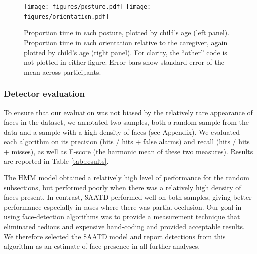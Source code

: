\documentclass[10pt,letterpaper]{article}
\begin{document}







\begin{figure}[t]
\centering
\texttt{[image: figures/posture.pdf]}
\texttt{[image: figures/orientation.pdf]}
\caption{\label{fig:posture} Proportion time in each posture, plotted by child's age (left panel). Proportion time in each orientation relative to the caregiver, again plotted by child's age (right panel). For clarity, the ``other'' code is not plotted in either figure. Error bars show standard error of the mean across participants.} 
\end{figure}


\subsubsection{Detector evaluation}

To ensure that our evaluation was not biased by the relatively rare appearance of faces in the dataset, we annotated two samples, both a random sample from the data and a sample with a high-density of faces (see Appendix). We evaluated each algorithm on its precision (hits / hits + false alarms) and recall (hits / hits + misses), as well as F-score (the harmonic mean of these two measures). Results are reported in Table \ref{tab:results}. 

The HMM model obtained a relatively high level of performance for the random subsections, but performed poorly when there was a relatively high density of faces present. In contrast, SAATD performed well on both samples, giving better performance especially in cases where there was partial occlusion. Our goal in using face-detection algorithms was to provide a measurement technique that eliminated tedious and expensive hand-coding and provided acceptable results. We therefore selected the SAATD model and report detections from this algorithm as an estimate of face presence in all further analyses. 
\end{document}
